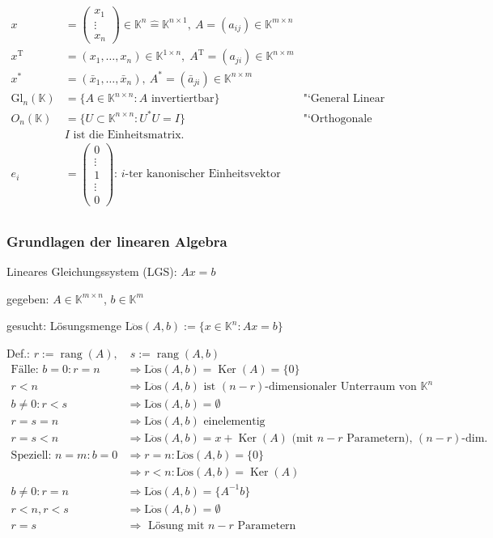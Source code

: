 \documentclass[11pt]{scrartcl}
\newcommand*{\T}{\mathrm T}
\newcommand*{\Gl}{\mathrm{Gl}}
\newcommand*{\Loes}{\mathrm{L\ddot{o}s}}
\DeclareMathOperator*{\rang}{\mathrm{rang}}
\DeclareMathOperator*{\Ker}{\mathrm{Ker}}
\theoremstyle{break}
\theoremstyle{remark}
\begin{document}
\begin{align*}
x &= \begin{pmatrix} x_1 \\ \vdots \\ x_n \end{pmatrix}
\in \mathbb{K}^n \widehat{=} \mathbb{K}^{n \times 1},
~ A=(a_{ij}) \in \mathbb{K}^{m \times n}  \\
x^\T &= (x_1, \dots, x_n) \in \mathbb{K}^{1 \times n},\;
A^\T = (a_{ji}) \in \mathbb{K}^{n \times m}  \\
x^{\ast} &= (\bar{x}_1, \dots, \bar{x}_n),
~A^{\ast} = (\bar{a}_{ji}) \in \mathbb{K}^{n \times m}  \\
\Gl_n(\mathbb K) &= \{A \in \mathbb{K}^{n \times n}: A
\text{ invertiertbar} \} & \text{"`General Linear Group"'}  \\
O_n (\mathbb{K})&= \{ U \subset \mathbb{K}^{n \times n}:
U^{\ast} U = I \} & \text{"`Orthogonale Gruppe"'} \\
& I \text{ ist die Einheitsmatrix.} \\
e_i &= \begin{pmatrix} 0 \\ \vdots \\ 1 \\ \vdots \\ 0 \end{pmatrix}
\text{:  $i$-ter kanonischer Einheitsvektor } \\
\end{align*}

\subsubsection{Grundlagen der linearen Algebra}

Lineares Gleichungssystem (LGS): $Ax=b$

gegeben: $A \in \mathbb{K}^{m \times n}$, $b \in \mathbb{K}^m$

gesucht: Lösungsmenge $\Loes(A,b) := \{x \in \mathbb{K}^n : Ax=b\} $


Def.: $r := \rang(A),\quad s := \rang(A,b)$
\begin{align*}
\text{Fälle: } b =0 : r = n &\Rightarrow \Loes(A,b)=\Ker(A)=\{0\}\\
r<n &\Rightarrow \Loes(A,b) \text{ ist $(n-r)$-dimensionaler Unterraum
von } \mathbb{K}^n \\
b \neq 0: r<s &\Rightarrow \Loes(A,b) = \emptyset \\
r=s=n &\Rightarrow \Loes(A,b) \text{ einelementig }\\
r=s<n &\Rightarrow \Loes(A,b) = x + \Ker(A)
\text{ (mit $n-r$ Parametern), $(n-r)$-dim. } \\
\text{Speziell: } n=m: b=0 &\Rightarrow r=n: \Loes(A,b) = \{0\}\\
&\Rightarrow r<n: \Loes(A,b) = \Ker(A)\\
b \neq 0: r=n &\Rightarrow \Loes(A,b) = \{A^{-1}b\}\\
	r<n, r<s &\Rightarrow \Loes(A,b) = \emptyset \\
	 r=s &\Rightarrow \text{ Lösung mit $n-r$ Parametern } \\
\end{align*}
\end{document}
